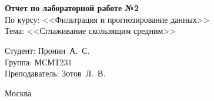 \begin{titlepage}
	\centering

	\vspace{-2.2mm}
	\vhrulefill{0.9mm}\\
	\vspace{-7mm}
	\vhrulefill{0.2mm}\\
	\vspace{2mm}

	\vspace{50mm}

	\vspace{30mm}
	
	\textbf{Отчет по лабораторной работе №2}\\
	По курсу: <<Фильтрация и прогнозирование данных>>\\
	Тема: <<Сглаживание скользящим средним>>\\

	\vspace{60mm}

	\hspace{70mm} Студент:       \hfill Пронин~А.~С.\\
	\hspace{70mm} Группа:        \hfill МСМТ231\\
	\hspace{70mm} Преподаватель: \hfill Зотов~Л.~В.\\

	\vfill
	
	Москва\\
	\the\year
\end{titlepage}

\setcounter{page}{2}